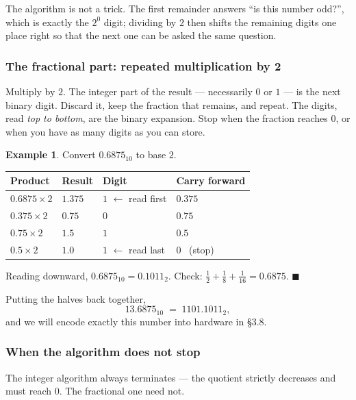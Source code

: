 \documentclass[11pt]{article}
\theoremstyle{plain}
\theoremstyle{definition}
\newtheorem{ex}{Example}[section]
\theoremstyle{remark}
\begin{document}
\noindent The algorithm is not a trick. The first remainder answers ``is this
number odd?'', which is exactly the $2^{0}$ digit; dividing by $2$ then shifts
the remaining digits one place right so that the next one can be asked the same
question.

\subsubsection*{The fractional part: repeated multiplication by 2}
Multiply by $2$. The integer part of the result --- necessarily $0$ or $1$ ---
is the next binary digit. Discard it, keep the fraction that remains, and
repeat. The digits, read \emph{top to bottom}, are the binary expansion. Stop
when the fraction reaches $0$, or when you have as many digits as you can
store.

\begin{ex}
Convert $0.6875_{10}$ to base $2$.

\begin{center}
\renewcommand{\arraystretch}{1.15}
\begin{tabular}{@{}l l l l@{}}
\toprule
\textbf{Product} & \textbf{Result} & \textbf{Digit} & \textbf{Carry forward} \\
\midrule
$0.6875\times2$ & $1.375$ & $1$ \quad$\leftarrow$ read first & $0.375$ \\
$0.375 \times2$ & $0.75$  & $0$ & $0.75$ \\
$0.75  \times2$ & $1.5$   & $1$ & $0.5$ \\
$0.5   \times2$ & $1.0$   & $1$ \quad$\leftarrow$ read last  & $0$ \ (stop) \\
\bottomrule
\end{tabular}
\end{center}

\noindent Reading downward, $0.6875_{10}=0.1011_{2}$. Check:
$\tfrac12+\tfrac18+\tfrac1{16}=0.6875$. \hfill$\blacksquare$
\end{ex}

\noindent Putting the halves back together,
\[
  13.6875_{10} \;=\; 1101.1011_{2},
\]
and we will encode exactly this number into hardware in \S3.8.

\subsubsection*{When the algorithm does not stop}
The integer algorithm always terminates --- the quotient strictly decreases and
must reach $0$. The fractional one need not.
\end{document}
